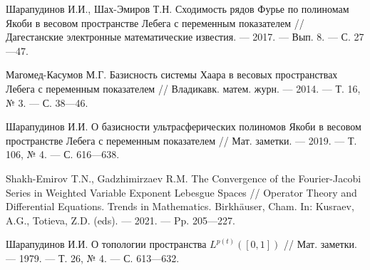 \begin{thebibliography}{111}
Шарапудинов И.И., Шах-Эмиров Т.Н.
Сходимость рядов Фурье по полиномам Якоби в весовом пространстве Лебега с переменным показателем
//
Дагестанские электронные математические известия.
--- 2017.
--- Вып. 8.
--- С. 27---47.

Магомед-Касумов М.Г.
Базисность системы Хаара в весовых пространствах Лебега с переменным показателем
//
Владикавк. матем. журн.
--- 2014.
--- Т. 16, № 3.
--- С. 38---46.

Шарапудинов И.И.
О базисности ультрасферических полиномов Якоби в весовом пространстве Лебега с переменным показателем
//
Мат. заметки.
--- 2019.
--- Т. 106, № 4.
--- С. 616---638.

Shakh-Emirov T.N., Gadzhimirzaev R.M.
The Convergence of the Fourier-Jacobi Series in Weighted Variable Exponent Lebesgue Spaces
//
Operator Theory and Differential Equations. Trends in Mathematics. Birkhäuser, Cham.  In: Kusraev, A.G., Totieva, Z.D. (eds).
--- 2021.
--- Pp. 205---227.

Шарапудинов И.И.
О топологии пространства $L^{p(t)}([0,1])$
//
Мат. заметки.
--- 1979.
--- Т. 26, № 4.
--- С. 613---632.

\end{thebibliography} 